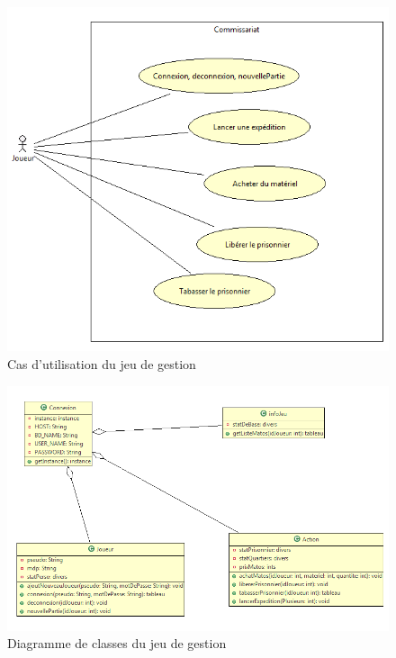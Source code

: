 \begin{figure}[h]
 \centering
 \includegraphics[width=\textwidth]{../umls/UML_images/Commissariat/utilisation} \hfill
 \caption{Cas d'utilisation du jeu de gestion}
\end{figure}

\begin{figure}[h]
 \centering
 \includegraphics[width=\textwidth]{../umls/UML_images/Commissariat/class} \hfill
 \caption{Diagramme de classes du jeu de gestion}
\end{figure}